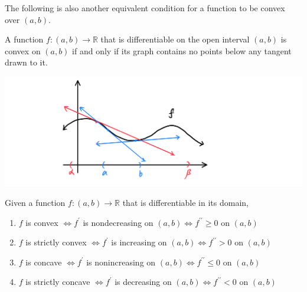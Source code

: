     The following is also another equivalent condition for a function to be convex over $(a, b)$. 

    \begin{proposition}
    A function $f: (a, b) \longrightarrow \mathbb{R}$ that is differentiable on the open interval $(a, b)$ is convex on $(a, b)$ if and only if its graph contains no points below any tangent drawn to it.
    \begin{center}
        \includegraphics[scale=0.25]{img/Convex_Function_Over_Tangent_Line.PNG}
    \end{center}
    \end{proposition}

    \begin{theorem}
    Given a function $f: (a, b) \longrightarrow \mathbb{R}$ that is differentiable in its domain, 
    \begin{enumerate}
      \item $f$ is convex $\iff f^\prime$ is nondecreasing on $(a, b) \iff f^{\prime\prime} \geq 0$ on $(a, b)$ 
      \item $f$ is strictly convex $\iff f^\prime$ is increasing on $(a, b) \iff f^{\prime\prime} > 0$ on $(a, b)$ 
      \item $f$ is concave $\iff f^\prime$ is nonincreasing on $(a, b) \iff f^{\prime\prime} \leq 0$ on $(a, b)$ 
      \item $f$ is strictly concave $\iff f^\prime$ is decreasing on $(a, b) \iff f^{\prime\prime} < 0$ on $(a, b)$ 
    \end{enumerate}
    \end{theorem}

